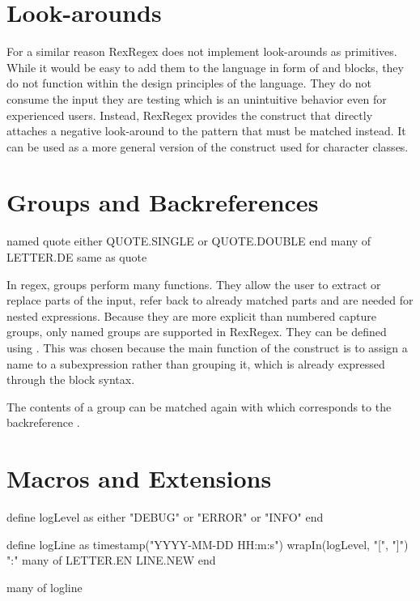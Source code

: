 \section{Look-arounds}

For a similar reason RexRegex does not implement look-arounds as primitives. While it would be easy to add them to the language in form of  and  blocks, they do not function within the design principles of the language. They do not consume the input they are testing which is an unintuitive behavior even for experienced users. Instead, RexRegex provides the  construct that directly attaches a negative look-around to the pattern that must be matched instead. It can be used as a more general version of the  construct used for character classes.

\section{Groups and Backreferences}

\begin{rexregexBox}[label=code:dslGroupsAndBackrefs,title=Groups and Backreferences in RexRegex]
named quote
    either QUOTE.SINGLE or QUOTE.DOUBLE
end
many of LETTER.DE
same as quote
\end{rexregexBox}

In regex, groups perform many functions. They allow the user to extract or replace parts of the input, refer back to already matched parts and are needed for nested expressions. Because they are more explicit than numbered capture groups, only named groups are supported in RexRegex. They can be defined using . This was chosen because the main function of the construct is to assign a name to a subexpression rather than grouping it, which is already expressed through the block syntax.

The contents of a group can be matched again with  which corresponds to the backreference . 

\section{Macros and Extensions} \label{sec:macros}

\begin{rexregexBox}[float=htb,label=code:dslMacros,title=Macros in RexRegex,width=12cm,center]
define logLevel as
    either "DEBUG" or "ERROR" or "INFO"
end

define logLine as
    timestamp("YYYY-MM-DD HH:m:s")
    wrapIn(logLevel, "[", "]")
    ":"
    many of LETTER.EN
    LINE.NEW
end

many of logline
\end{rexregexBox}

